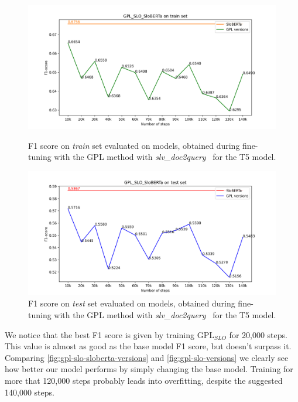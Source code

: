 \documentclass[fleqn,moreauthors,10pt]{ds_report}
\begin{document}
\begin{figure}
    \centering
    \begin{minipage}{0.5\textwidth}
        \centering
        \includegraphics[width=\linewidth]{graphs/GPL_SLO_SloBERTa_train.png}
        \caption{F1 score on \textit{train} set evaluated on models, obtained during fine-tuning with the GPL method with {\it slv\_doc2query}~\cite{boshko} for the T5 model.}
		\label{fig:gpl-sloberta-slo-versions-train}
    \end{minipage}\hfill
    \begin{minipage}{0.5\textwidth}
        \centering
        \includegraphics[width=\linewidth]{graphs/GPL_SLO_SloBERTa_test.png}
        \caption{F1 score on \textit{test} set evaluated on models, obtained during fine-tuning with the GPL method with {\it slv\_doc2query}~\cite{boshko} for the T5 model.}
		\label{fig:gpl-sloberta-slo-versions}
    \end{minipage}
\end{figure}

We notice that the best F1 score is given by training $\text{GPL}_{SLO}$ for 20,000 steps. This value is almost as good
as the base model F1 score, but doesn't surpass it. Comparing \ref*{fig:gpl-slo-sloberta-versions} and \ref*{fig:gpl-slo-versions}
we clearly see how better our model performs by simply changing the base model. Training for more that 120,000 steps probably
leads into overfitting, despite the suggested~\cite{GPL} 140,000 steps.
\end{document}
